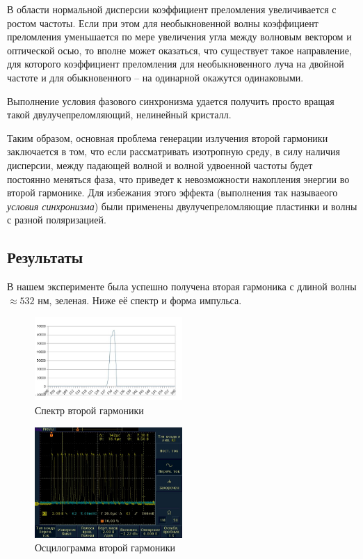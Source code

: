 \documentclass[twocolumn]{article}
\begin{document}
	В области нормальной дисперсии коэффициент преломления увеличивается с ростом частоты. Если при этом для необыкновенной волны коэффициент преломления уменьшается по мере увеличения угла между волновым вектором и оптической осью, то вполне может оказаться, что существует такое направление, для которого коэффициент преломления для необыкновенного луча на двойной частоте и для обыкновенного – на одинарной окажутся одинаковыми.
	
	
	Выполнение условия фазового синхронизма удается получить просто вращая такой двулучепреломляющий, нелинейный кристалл.


Таким образом, основная проблема генерации излучения второй гармоники
заключается в том, что если рассматривать изотропную среду, в силу
наличия дисперсии, между падающей волной и волной удвоенной частоты
будет постоянно меняться фаза, что приведет к невозможности накопления
энергии во второй гармонике. Для избежания этого эффекта (выполнения так
называеого \emph{условия синхронизма}) были применены
двулучепреломляющие пластинки и волны с разной поляризацией.\subsection{Результаты}В нашем эксперименте была успешно получена вторая гармоника с длиной
волны $\approx532$ нм, зеленая. Ниже её спектр и форма импульса. 
\begin{figure}[h]
\includegraphics[width=0.5\textwidth]{LEMPH Report_files/green laser.jpg}
\caption{Спектр второй гармоники}
\end{figure}
\begin{figure}
    \includegraphics[width=0.5\textwidth]{LEMPH Report_files/without filters.jpg}
	\caption{Осцилограмма второй гармоники}
    \end{figure}
\newpage
\end{document}

